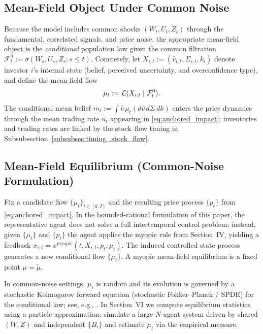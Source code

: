 
\subsection{Mean-Field Object Under Common Noise}

Because the model includes common shocks $(W_t,U_t,Z_t)$ through the fundamental, correlated signals, and price noise, the appropriate mean-field object is the \emph{conditional} population law given the common filtration $\mathcal{F}^0_t := \sigma(W_s,U_s,Z_s: s\le t)$. Concretely, let $X_{i,t}:=(\hat v_{i,t},\Sigma_{i,t},k_i)$ denote investor $i$'s internal state (belief, perceived uncertainty, and overconfidence type), and define the mean-field flow
\begin{equation}
\mu_t := \mathcal{L}(X_{i,t}\mid \mathcal{F}^0_t).
\end{equation}
The conditional mean belief $m_t := \int \hat v\,\mu_t(d\hat v\,d\Sigma\,dk)$ enters the price dynamics through the mean trading rate $\bar u_t$ appearing in \eqref{eq:anchored_impact}; inventories and trading rates are linked by the stock--flow timing in Subsubsection~\ref{subsubsec:timing_stock_flow}.

\subsection{Mean-Field Equilibrium (Common-Noise Formulation)}

Fix a candidate flow $\{\mu_t\}_{t\in[0,T]}$ and the resulting price process $\{p_t\}$ from \eqref{eq:anchored_impact}. In the bounded-rational formulation of this paper, the representative agent does not solve a full intertemporal control problem; instead, given $\{\mu_t\}$ and $\{p_t\}$ the agent applies the myopic rule from Section~IV, yielding a feedback $x_{i,t} = x^{\mathrm{myopic}}(t,X_{i,t},p_t,\mu_t)$. The induced controlled state process generates a new conditional flow $\{\tilde\mu_t\}$. A myopic mean-field equilibrium is a fixed point $\mu=\tilde\mu$.

In common-noise settings, $\mu_t$ is random and its evolution is governed by a stochastic Kolmogorov forward equation (stochastic Fokker--Planck / SPDE) for the conditional law; see, e.g., \cite{CarmonaDelarueMFGVol1,Lacker2016}. In Section~VI we compute equilibrium statistics using a particle approximation: simulate a large $N$-agent system driven by shared $(W,Z)$ and independent $\{B_i\}$ and estimate $\mu_t$ via the empirical measure.

